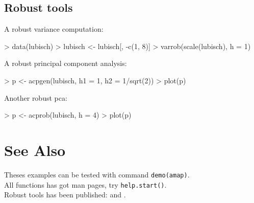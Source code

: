 \documentclass[a4paper]{article}
\begin{document}
\subsection{Robust tools}

A robust variance computation:
\begin{Schunk}
\begin{Sinput}
> data(lubisch)
> lubisch <- lubisch[, -c(1, 8)]
> varrob(scale(lubisch), h = 1)
\end{Sinput}
\end{Schunk}
A robust principal component analysis:
\begin{Schunk}
\begin{Sinput}
> p <- acpgen(lubisch, h1 = 1, h2 = 1/sqrt(2))
> plot(p)
\end{Sinput}
\end{Schunk}
Another robust pca:
\begin{Schunk}
\begin{Sinput}
> p <- acprob(lubisch, h = 4)
> plot(p)
\end{Sinput}
\end{Schunk}


\section{See Also}

Theses examples can be tested with command
{\tt demo(amap)}.\\

\noindent
All functions has got man pages, try 
{\tt help.start()}.\\

\noindent
Robust tools has been published: \cite{caussinu+ruiz} and
\cite{caussinu+ruiz2}.



\end{document}
